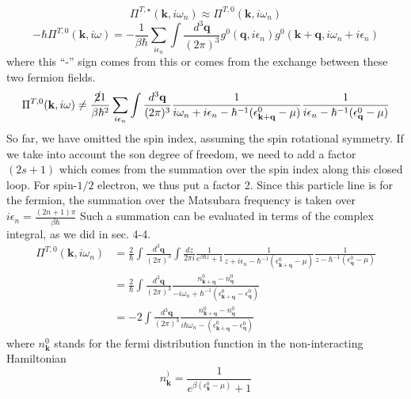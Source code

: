 \begin{equation}\label{eq4.9.24}
\Pi^{T,\star}(\mathbf k,i\omega_n)\approx \Pi^{T,0}(\mathbf k,i\omega_n)
\end{equation}
\begin{equation}
-\hbar \Pi^{T,0}(\mathbf k,i\omega)=-\frac{1}{\beta\hbar} \sum_{i\epsilon_n} \int \frac{d^3 \mathbf q}{(2\pi)^3} g^0(\mathbf q,i\epsilon_n) g^0(\mathbf k+\mathbf q,i\omega_n+i\epsilon_n)
\end{equation}
where this ``-'' sign comes from this or comes from the exchange between these two fermion fields.
\begin{equation}
\Pi^{T,0}(\mathbf k,i\omega)\not=\frac{\cancel{2}{1}}{\beta\hbar^2} \sum_{i\epsilon_n} \int \frac{d^3\mathbf q}{(2\pi)^3}\frac{1}{i\omega_n+i\epsilon_n-\hbar^{-1}(\epsilon^0_{\mathbf k+\mathbf q}-\mu)} \frac{1}{i\epsilon_n-\hbar^{-1}(\epsilon^0_{\mathbf q}-\mu)}
\end{equation}
 So far, we have omitted the spin index, assuming the spin rotational symmetry.
 If we take into account the son degree of freedom, we need to add a factor $(2s+1)$ which comes from the summation over
the spin index along this closed loop.
 For spin-$1/2$ electron, we thus put a factor 2.
 Since this particle line is for the fermion, the summation over the Matsubara frequency is taken over $i\epsilon_n=\frac{(2n+1)\pi}{\beta\hbar}$
 Such a summation can be evaluated in terms of the complex integral, as we did in sec. 4-4.
\begin{equation}
\begin{aligned}
\Pi^{T,0}(\mathbf k,i\omega_n)&=\frac{2}{\hbar}\int \frac{d^3 \mathbf q}{(2\pi)^3} \int\frac{dz}{2\pi i}\frac{1}{e^{\beta\hbar z}+1} \frac{1}{z+i\epsilon_n-\hbar^{-1}(\epsilon^0_{\mathbf k+\mathbf q}-\mu)} \frac{1}{z-\hbar^{-1}(\epsilon^0_{\mathbf q}-\mu)}\\
&=\frac{2}{\hbar} \int \frac{d^3\mathbf q}{(2\pi)^3} \frac{n^0_{\mathbf k+\mathbf q}-n^0_{\mathbf q}}{-i\omega_n+\hbar^{-1}(\epsilon^0_{\mathbf k+\mathbf q}-\epsilon^0_{\mathbf q})}\\
&=-2\int \frac{d^3\mathbf q}{(2\pi)^3}\frac{n^0_{\mathbf k+\mathbf q}-n^0_{\mathbf q}}{i\hbar\omega_n-(\epsilon^0_{\mathbf k+\mathbf q}-\epsilon^0_{\mathbf q})}
\end{aligned}
\end{equation}
 where $n_{\mathbf k}^0$ stands for the fermi distribution function in the non-interacting Hamiltonian
\[
n^)_{\mathbf k}=\frac{1}{e^{\beta(\epsilon_{\mathbf k}^0-\mu)}+1}
\]
